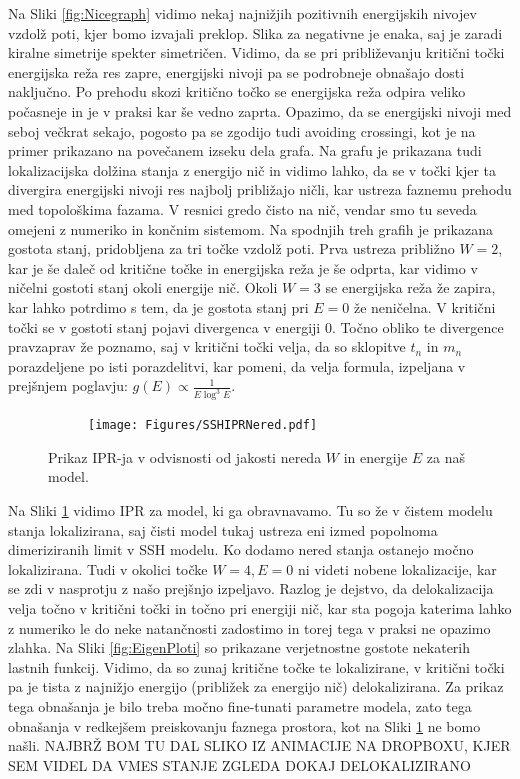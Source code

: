 Na Sliki \ref{fig:Nicegraph} vidimo nekaj najnižjih pozitivnih energijskih nivojev vzdolž poti, kjer bomo izvajali preklop. Slika za negativne je enaka, saj je zaradi kiralne simetrije spekter simetričen. Vidimo, da se pri približevanju kritični točki energijska reža res zapre, energijski nivoji pa se podrobneje obnašajo dosti naključno. Po prehodu skozi kritično točko se energijska reža odpira veliko počasneje in je v praksi kar še vedno zaprta. Opazimo, da se energijski nivoji med seboj večkrat sekajo, pogosto pa se zgodijo tudi avoiding crossingi, kot je na primer prikazano na povečanem izseku dela grafa.
Na grafu je prikazana tudi lokalizacijska dolžina stanja z energijo nič in vidimo lahko, da se v točki kjer ta divergira energijski nivoji res najbolj približajo ničli, kar ustreza faznemu prehodu med topološkima fazama. V resnici gredo čisto na nič, vendar smo tu seveda omejeni z numeriko in končnim sistemom. 
Na spodnjih treh grafih je prikazana gostota stanj, pridobljena za tri točke vzdolž poti. Prva ustreza približno $W=2$, kar je še daleč od kritične točke in energijska reža je še odprta, kar vidimo v ničelni gostoti stanj okoli energije nič. Okoli $W=3$ se energijska reža že zapira, kar lahko potrdimo s tem, da je gostota stanj pri $E=0$ že neničelna. V kritični točki se v gostoti stanj pojavi divergenca v energiji $0$. Točno obliko te divergence pravzaprav že poznamo, saj v kritični točki velja, da so sklopitve $t_n$ in $m_n$ porazdeljene po isti porazdelitvi, kar pomeni, da velja formula, izpeljana v prejšnjem poglavju: $g(E) \propto \frac{1}{E \log^3 E}$.
\begin{figure}[H]
\centering
\begin{subfigure}{.7\textwidth}
\texttt{[image: Figures/SSHIPRNered.pdf]}
\end{subfigure}
\caption{Prikaz IPR-ja v odvisnosti od jakosti nereda $W$ in energije $E$ za naš model.}
\label{fig:SSHIPRNered}
\end{figure}
Na Sliki \ref{fig:SSHIPRNered} vidimo IPR za model, ki ga obravnavamo. Tu so že v čistem modelu stanja lokalizirana, saj čisti model tukaj ustreza eni izmed popolnoma dimeriziranih limit v SSH modelu. Ko dodamo nered stanja ostanejo močno lokalizirana. Tudi v okolici točke $W=4, E=0$ ni videti nobene lokalizacije, kar se zdi v nasprotju z našo prejšnjo izpeljavo. Razlog je dejstvo, da delokalizacija velja točno v kritični točki in točno pri energiji nič, kar sta pogoja katerima lahko z numeriko le do neke natančnosti zadostimo in torej tega v praksi ne opazimo zlahka. Na Sliki \ref{fig:EigenPloti} so prikazane verjetnostne gostote nekaterih lastnih funkcij. Vidimo, da so zunaj kritične točke te lokalizirane, v kritični točki pa je tista z najnižjo energijo (približek za energijo nič) delokalizirana. Za prikaz tega obnašanja je bilo treba močno fine-tunati parametre modela, zato tega obnašanja v redkejšem preiskovanju faznega prostora, kot na Sliki \ref{fig:SSHIPRNered} ne bomo našli. NAJBRŽ BOM TU DAL SLIKO IZ ANIMACIJE NA DROPBOXU, KJER SEM VIDEL DA VMES STANJE ZGLEDA DOKAJ DELOKALIZIRANO
